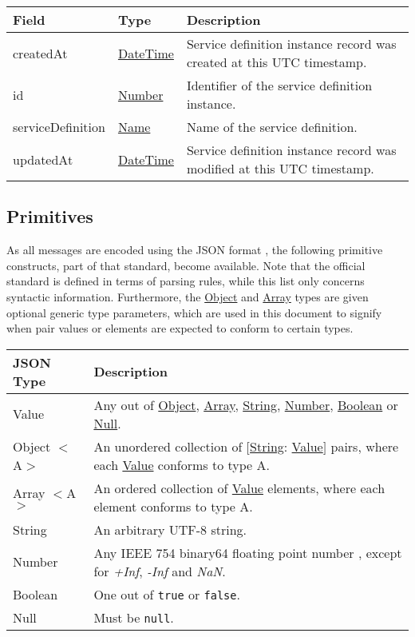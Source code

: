 \documentclass[a4paper]{arrowhead}
\newcommand{\pdef}[1]{{\textcolor{ArrowheadGrey}{#1 \label{sec:model:primitives:#1} \label{sec:model:primitives:#1s}}}}
\newcommand{\pref}[1]{{\textcolor{ArrowheadGrey}{\hyperref[sec:model:primitives:#1]{#1}}}}
\begin{document}
\begin{table}[ht!]
\begin{tabularx}{\textwidth}{| p{4.25cm} | p{3.5cm} | X |} \hline
\rowcolor{gray!33} Field & Type      & Description \\ \hline
createdAt & \pref{DateTime} & Service definition instance record was created at this UTC timestamp. \\ \hline
id & \pref{Number} & Identifier of the service definition instance. \\ \hline
serviceDefinition &\pref{Name}  & Name of the service definition. \\ \hline
updatedAt & \pref{DateTime} & Service definition instance record was modified at this UTC timestamp. \\ \hline
\end{tabularx}
\end{table}

\subsection{Primitives}
\label{sec:model:primitives}

As all messages are encoded using the JSON format \cite{bray2014json}, the following primitive constructs, part of that standard, become available.
Note that the official standard is defined in terms of parsing rules, while this list only concerns syntactic information.
Furthermore, the \pref{Object} and \pref{Array} types are given optional generic type parameters, which are used in this document to signify when pair values or elements are expected to conform to certain types. 

\begin{table}[ht!]
\begin{tabularx}{\textwidth}{| p{3cm} | X |} \hline
\rowcolor{gray!33} JSON Type & Description \\ \hline
\pdef{Value}                 & Any out of \pref{Object}, \pref{Array}, \pref{String}, \pref{Number}, \pref{Boolean} or \pref{Null}. \\ \hline
\pdef{Object}$<$A$>$         & An unordered collection of $[$\pref{String}: \pref{Value}$]$ pairs, where each \pref{Value} conforms to type A. \\ \hline
\pdef{Array}$<$A$>$          & An ordered collection of \pref{Value} elements, where each element conforms to type A. \\ \hline
\pdef{String}                & An arbitrary UTF-8 string. \\ \hline
\pdef{Number}                & Any IEEE 754 binary64 floating point number \cite{cowlishaw2019floating}, except for \textit{+Inf}, \textit{-Inf} and \textit{NaN}. \\ \hline
\pdef{Boolean}               & One out of \texttt{true} or \texttt{false}. \\ \hline
\pdef{Null}                  & Must be \texttt{null}. \\ \hline
\end{tabularx}
\end{table}
\end{document}
